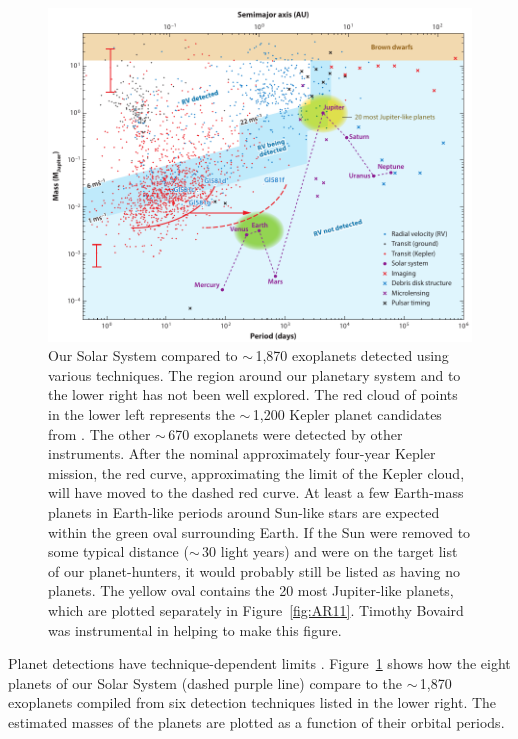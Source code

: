 \begin{figure}[!hbt]
	\centering
	\includegraphics[width=0.9\linewidth]{figures/AnnRevs/AR9.pdf}
	\caption[Exoplanet detection techiques and yeilds]{Our Solar System compared to $\sim$\,1,870 exoplanets detected using various techniques. The region around our planetary system and to the lower right has not been well explored. The red cloud of points in the lower left represents the $\sim$\,1,200 Kepler planet candidates from \citet{Borucki2011}. The other $\sim$\,670 exoplanets were detected by other instruments. After the nominal approximately four-year Kepler mission, the red curve, approximating the limit of the Kepler cloud, will have moved to the dashed red curve. At least a few Earth-mass planets in Earth-like periods around Sun-like stars are expected within the green oval surrounding Earth. If the Sun were removed to some typical distance ($\sim$\,30 light years) and were on the target list of our planet-hunters, it would probably still be listed as having no planets. The yellow oval contains the 20 most Jupiter-like planets, which are plotted separately in Figure~\ref{fig:AR11}. Timothy Bovaird was instrumental in helping to make this figure.}
	\label{fig:AR9}
\end{figure}


Planet detections have technique-dependent limits \citep{Cumming2010}. Figure~\ref{fig:AR9} shows how the eight planets of our Solar System (dashed purple line) compare to the $\sim$\,1,870 exoplanets compiled from six detection techniques listed in the lower right. The estimated masses of the planets are plotted as a function of their orbital periods.

